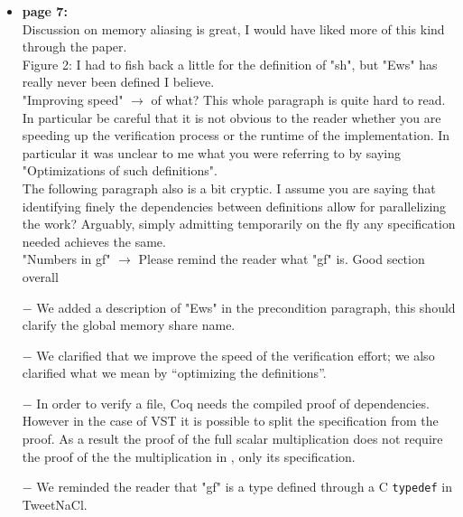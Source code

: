 \begin{itemize}
  \item \textbf{page 7:}\\
        Discussion on memory aliasing is great, I would have liked more of this kind through the paper.\\
        Figure 2: I had to fish back a little for the definition of "sh", but "Ews" has really never been defined I believe.\\
        "Improving speed" $\rightarrow$ of what? This whole paragraph is quite hard to read. In particular be careful that it is not obvious to the reader whether you are speeding up the verification process or the runtime of the implementation. In particular it was unclear to me what you were referring to by saying "Optimizations of such definitions".\\
        The following paragraph also is a bit cryptic. I assume you are saying that identifying finely the dependencies between definitions allow for parallelizing the work? Arguably, simply admitting temporarily on the fly any specification needed  achieves the same.\\
        "Numbers in gf" $\rightarrow$ Please remind the reader what "gf" is. Good section overall
\end{itemize}
\begin{answer}
  \begin{itemize}
    \item[$-$] We added a description of "Ews" in the precondition paragraph, this should clarify the global memory share name.
    \item[$-$] We clarified that we improve the speed of the verification effort; we also clarified what we mean by ``optimizing the
      definitions''.
    \item[$-$] In order to verify a file, Coq needs the compiled proof of dependencies. However in the case of VST it is possible to split the specification from the proof. As a result the proof of the full scalar multiplication does not require the proof of the the multiplication in , only its specification.
    \item[$-$] We reminded the reader that "gf" is a type defined through a C \texttt{typedef} in TweetNaCl.
  \end{itemize}
\end{answer}

